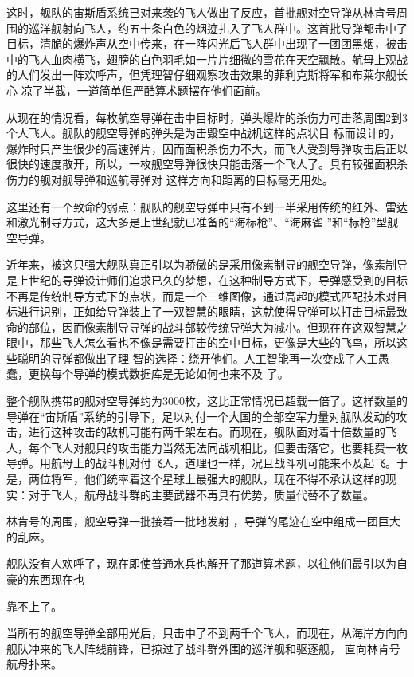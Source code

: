 \documentclass{article}
\begin{document}
这时，舰队的宙斯盾系统已对来袭的飞人做出了反应，首批舰对空导弹从林肯号周围的巡洋舰射向飞人，约五十条白色的烟迹扎入了飞人群中。这首批导弹都击中了目标，清脆的爆炸声从空中传来，在一阵闪光后飞人群中出现了一团团黑烟，被击中的飞人血肉横飞，翅膀的白色羽毛如一片片细微的雪花在天空飘散。航母上观战的人们发出一阵欢呼声，但凭理智仔细观察攻击效果的菲利克斯将军和布莱尔舰长心
凉了半截，一道简单但严酷算术题摆在他们面前。 

从现在的情况看，每枚航空导弹在击中目标时，弹头爆炸的杀伤力可击落周围2到3个人飞人。舰队的舰空导弹的弹头是为击毁空中战机这样的点状目
\newpage
标而设计的，爆炸时只产生很少的高速弹片，因而面积杀伤力不大，而飞人受到导弹攻击后正以很快的速度散开，所以，一枚舰空导弹很快只能击落一个飞人了。具有较强面积杀伤力的舰对舰导弹和巡航导弹对
这样方向和距离的目标毫无用处。 

这里还有一个致命的弱点：舰队的舰空导弹中只有不到一半采用传统的红外、雷达和激光制导方式，这大多是上世纪就已准备的“海标枪”、“海麻雀
”和“标枪”型舰空导弹。 

近年来，被这只强大舰队真正引以为骄傲的是采用像素制导的舰空导弹，像素制导是上世纪的导弹设计师们追求已久的梦想，在这种制导方式下，导弹感受到的目标不再是传统制导方式下的点状，而是一个三维图像，通过高超的模式匹配技术对目标进行识别，正如给导弹装上了一双智慧的眼睛，这就使得导弹可以打击目标最致命的部位，因而像素制导导弹的战斗部较传统导弹大为减小。但现在在这双智慧之眼中，那些飞人怎么看也不像是需要打击的空中目标，更像是大些的飞鸟，所以这些聪明的导弹都做出了理
\newpage
智的选择：绕开他们。人工智能再一次变成了人工愚蠢，更换每个导弹的模式数据库是无论如何也来不及
了。 

整个舰队携带的舰对空导弹约为3000枚，这比正常情况已超载一倍了。这样数量的导弹在“宙斯盾”系统的引导下，足以对付一个大国的全部空军力量对舰队发动的攻击，进行这种攻击的敌机可能有两千架左右。而现在，舰队面对着十倍数量的飞人，每个飞人对舰只的攻击能力当然无法同战机相比，但要击落它，也要耗费一枚导弹。用航母上的战斗机对付飞人，道理也一样，况且战斗机可能来不及起飞。于是，两位将军，他们统率着这个星球上最强大的舰队，现在不得不承认这样的现实：对于飞人，航母战斗群的主要武器不再具有优势，质量代替不了数量。

林肯号的周围，舰空导弹一批接着一批地发射
，导弹的尾迹在空中组成一团巨大的乱麻。 

舰队没有人欢呼了，现在即使普通水兵也解开了那道算术题，以往他们最引以为自豪的东西现在也
\newpage

靠不上了。 

当所有的舰空导弹全部用光后，只击中了不到两千个飞人，而现在，从海岸方向向舰队冲来的飞人阵线前锋，已掠过了战斗群外围的巡洋舰和驱逐舰，
直向林肯号航母扑来。 
\end{document}
